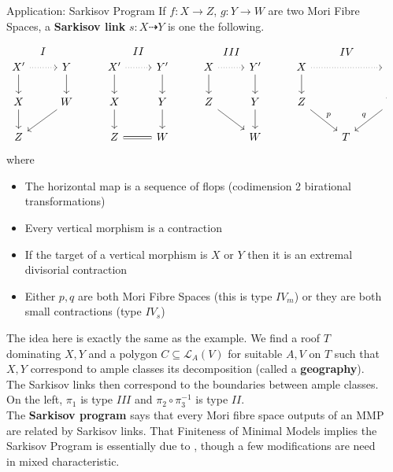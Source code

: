 \documentclass[final]{beamer}
\newlength{\sepwidth}
\newcommand{\separatorcolumn}{\begin{column}{\sepwidth}\end{column}}
\begin{document}
\begin{frame}[t, fragile]
\begin{columns}[t]
\begin{column}{0.44\paperwidth}
			\begin{block}{Application: Sarkisov Program}
				If $f:X \to Z$, $g:Y \to W$ are two Mori Fibre Spaces, a \textbf{Sarkisov link} $s:X \dashrightarrow Y$ is one the following.
				
				\[\begin{tikzcd}
				X' \arrow[d] \arrow[r, dotted] \arrow[r, "I", phantom, bend left=49] & Y \arrow[d]  & X' \arrow[r, dotted] \arrow[d] \arrow[r, "II",phantom, bend left=49] & Y' \arrow[d] & X \arrow[r, dotted] \arrow[d] \arrow[r, "III", phantom, bend left=49] & Y' \arrow[d] & X \arrow[d] \arrow[rr, dotted] \arrow[rr, "IV",phantom, bend left] &   & Y \arrow[d]       \\
				X \arrow[d]                                                          & W \arrow[ld] & X \arrow[d]                                               & Y \arrow[d]  & Z \arrow[rd]                                              & Y \arrow[d]  & Z \arrow[rd, "p"]                                          &   & W \arrow[ld, "q"'] \\
				Z                                                                    &              & Z \arrow[r, equal]                                                         & W            &                                                           & W            &                                                            & T &                  
				\end{tikzcd} \]
				where
				\begin{itemize}
					\item The horizontal map is a sequence of flops (codimension 2 birational transformations)
					\item Every vertical morphism is a contraction
					\item If the target of a vertical morphism is $X$ or $Y$ then it is an extremal divisorial contraction
					\item Either $p,q$ are both Mori Fibre Spaces (this is type $IV_{m}$) or they are both small contractions (type $IV_{s}$)
				\end{itemize}
				
				
				
				The idea here is exactly the same as the example. We find a roof $T$ dominating $X,Y$ and a polygon $C\subseteq \mathcal{L}_{A}(V)$ for suitable $A,V$ on $T$ such that $X,Y$ correspond to ample classes its decomposition (called a \textbf{geography}). The Sarkisov links then correspond to the boundaries between ample classes. On the left, $\pi_{1}$ is type $III$ and $\pi_{2} \circ \pi_{3}^{-1}$ is type $II$.\\
				\hfill \break
				The \textbf{Sarkisov program} says that every Mori fibre space outputs of an MMP are related by Sarkisov links. That Finiteness of Minimal Models implies the Sarkisov Program is essentially due to \cite{hacon2009sarkisov}, though a few modifications are need in mixed characteristic.
			\end{block}
		\end{column}
		
		\separatorcolumn
	\end{columns}
\end{frame}
\end{document}
